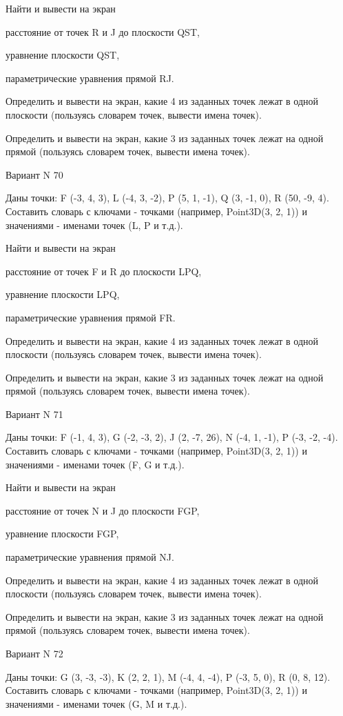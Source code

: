 \documentclass[11pt]{report}
\begin{document}
 
Найти и вывести на экран


расстояние от точек R и J до плоскости QST,

 
уравнение плоскости QST,

 
параметрические уравнения прямой RJ.


Определить и вывести на экран, какие 4 из заданных точек лежат в одной плоскости (пользуясь словарем точек, вывести имена точек).


Определить и вывести на экран, какие 3 из заданных точек лежат на одной прямой (пользуясь словарем точек, вывести имена точек).

Вариант N 70

Даны точки: F (-3, 4, 3), L (-4, 3, -2), P (5, 1, -1), Q (3, -1, 0), R (50, -9, 4).
Составить словарь с ключами - точками (например, Point3D(3, 2, 1)) и значениями - именами точек (L, P и т.д.).

 
Найти и вывести на экран


расстояние от точек F и R до плоскости LPQ,

 
уравнение плоскости LPQ,

 
параметрические уравнения прямой FR.


Определить и вывести на экран, какие 4 из заданных точек лежат в одной плоскости (пользуясь словарем точек, вывести имена точек).


Определить и вывести на экран, какие 3 из заданных точек лежат на одной прямой (пользуясь словарем точек, вывести имена точек).

Вариант N 71

Даны точки: F (-1, 4, 3), G (-2, -3, 2), J (2, -7, 26), N (-4, 1, -1), P (-3, -2, -4).
Составить словарь с ключами - точками (например, Point3D(3, 2, 1)) и значениями - именами точек (F, G и т.д.).

 
Найти и вывести на экран


расстояние от точек N и J до плоскости FGP,

 
уравнение плоскости FGP,

 
параметрические уравнения прямой NJ.


Определить и вывести на экран, какие 4 из заданных точек лежат в одной плоскости (пользуясь словарем точек, вывести имена точек).


Определить и вывести на экран, какие 3 из заданных точек лежат на одной прямой (пользуясь словарем точек, вывести имена точек).

Вариант N 72

Даны точки: G (3, -3, -3), K (2, 2, 1), M (-4, 4, -4), P (-3, 5, 0), R (0, 8, 12).
Составить словарь с ключами - точками (например, Point3D(3, 2, 1)) и значениями - именами точек (G, M и т.д.).
\end{document}

